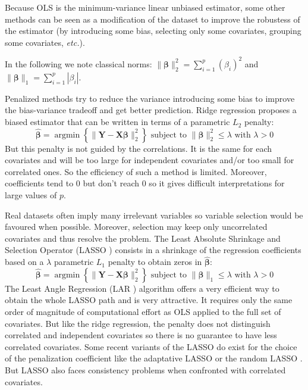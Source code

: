 \documentclass[11pt,a4paper]{article}
\begin{document}
	Because \textsc{OLS} is the minimum-variance linear unbiased estimator, some other methods can be seen as a modification of the dataset to improve the robustess of the estimator (by introducing some bias, selecting only some covariates, grouping some covariates, {\it etc.}).


In the following we note classical norms: $\parallel\boldsymbol{\beta}\parallel_2^2=\sum_{i=1}^p(\beta_i)^2$ and $\parallel\boldsymbol{\beta} \parallel_1=\sum_{i=1}^p|\beta_i| $.

	 Penalized methods try to reduce the variance introducing some bias to improve the bias-variance tradeoff and get better prediction.
	Ridge regression \cite{marquardt1975ridge} proposes a biased estimator that can be written in terms of a parametric $L_2$ penalty:
	\begin{equation}
		 \boldsymbol{\hat{\beta}}=\operatorname{argmin} \left\lbrace \parallel \boldsymbol{Y}-\boldsymbol{X\beta}\parallel_2^2 \right\rbrace \textrm{ subject to } \parallel \boldsymbol{\beta} \parallel_2^2\leq \lambda \textrm{ with } \lambda>0
	\end{equation}
	But this penalty is not guided by the correlations. It is the same for each covariates and will be too large for independent covariates and/or too small for correlated ones. So the efficiency of such a method is limited. 
	Moreover, coefficients tend to 0 but don't reach 0 so it gives difficult interpretations for large values of $p$. 
	
	Real datasets often imply many irrelevant variables so variable selection would be favoured when possible. Moreover, selection may keep only uncorrelated covariates and thus resolve the problem.	
	The Least Absolute Shrinkage and Selection Operator (\textsc{LASSO} \cite{tibshirani1996regression}) consists in a shrinkage of the regression coefficients based on a $\lambda$ parametric $L_1$ penalty to obtain zeros in $\hat{\boldsymbol{\beta}}$:
		\begin{equation}
		 \boldsymbol{\hat{\beta}}=\operatorname{argmin} \left\lbrace \parallel \boldsymbol{Y}-\boldsymbol{X\beta}\parallel_2^2 \right\rbrace \textrm{ subject to } \parallel\boldsymbol{\beta} \parallel_1\leq \lambda \textrm{ with } \lambda>0
		\end{equation}	
	 The Least Angle Regression (\textsc{LAR} \cite{efron2004least}) algorithm offers a very efficient way to obtain the whole LASSO path and is very attractive. It requires only the same order of magnitude of computational effort as \textsc{OLS} applied to the full set of covariates. But like the ridge regression, the penalty does not distinguish correlated and independent covariates so there is no guarantee to have less correlated covariates.
	 Some recent variants of the \textsc{LASSO} do exist for the choice of the penalization coefficient like the adaptative \textsc{LASSO} \cite{zou2006adaptive} or the random \textsc{LASSO} \cite{wang2011random}.  But \textsc{LASSO} also faces consistency problems \cite{Zhao2006MSC} when confronted with correlated covariates.
	 \\
	 
\end{document}
